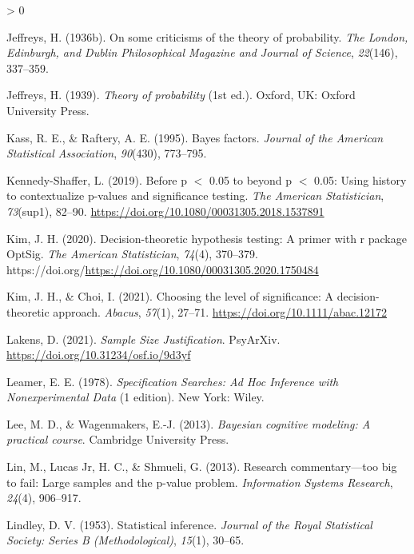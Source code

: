 \documentclass[
  english,
  ,man, a4paper,floatsintext]{apa6}
\newlength{\cslhangindent}
\newenvironment{CSLReferences}[2] %
 {%
  \setlength{\parindent}{0pt}
  \ifodd #1 \everypar{\setlength{\hangindent}{\cslhangindent}}\ignorespaces\fi
  \ifnum #2 > 0
  \setlength{\parskip}{#2\baselineskip}
  \fi
 }%
 {}
\begin{document}
\begin{CSLReferences}{1}{0}
\leavevmode\hypertarget{ref-jeffreys1936on}{}%
Jeffreys, H. (1936b). On some criticisms of the theory of probability. \emph{The London, Edinburgh, and Dublin Philosophical Magazine and Journal of Science}, \emph{22}(146), 337--359.

\leavevmode\hypertarget{ref-Jeffreys1939}{}%
Jeffreys, H. (1939). \emph{Theory of probability} (1st ed.). Oxford, UK: Oxford University Press.

\leavevmode\hypertarget{ref-kass1995bayes}{}%
Kass, R. E., \& Raftery, A. E. (1995). Bayes factors. \emph{Journal of the American Statistical Association}, \emph{90}(430), 773--795.

\leavevmode\hypertarget{ref-kennedy-shaffer_before_2019}{}%
Kennedy-Shaffer, L. (2019). Before p {\(<\)} 0.05 to beyond p {\(<\)} 0.05: Using history to contextualize p-values and significance testing. \emph{The American Statistician}, \emph{73}(sup1), 82--90. \url{https://doi.org/10.1080/00031305.2018.1537891}

\leavevmode\hypertarget{ref-kim2020decision}{}%
Kim, J. H. (2020). Decision-theoretic hypothesis testing: A primer with r package OptSig. \emph{The American Statistician}, \emph{74}(4), 370--379. https://doi.org/\url{https://doi.org/10.1080/00031305.2020.1750484}

\leavevmode\hypertarget{ref-kim2021choosing}{}%
Kim, J. H., \& Choi, I. (2021). Choosing the level of significance: A decision-theoretic approach. \emph{Abacus}, \emph{57}(1), 27--71. \url{https://doi.org/10.1111/abac.12172}

\leavevmode\hypertarget{ref-lakens_sample_2021}{}%
Lakens, D. (2021). \emph{Sample {Size} {Justification}}. PsyArXiv. \url{https://doi.org/10.31234/osf.io/9d3yf}

\leavevmode\hypertarget{ref-leamer_specification_1978}{}%
Leamer, E. E. (1978). \emph{Specification {Searches}: {Ad Hoc Inference} with {Nonexperimental Data}} (1 edition). {New York}: {Wiley}.

\leavevmode\hypertarget{ref-LeeWagenmakersBayesBook}{}%
Lee, M. D., \& Wagenmakers, E.-J. (2013). \emph{Bayesian cognitive modeling: {A} practical course}. Cambridge University Press.

\leavevmode\hypertarget{ref-lin2013research}{}%
Lin, M., Lucas Jr, H. C., \& Shmueli, G. (2013). Research commentary---too big to fail: Large samples and the p-value problem. \emph{Information Systems Research}, \emph{24}(4), 906--917.

\leavevmode\hypertarget{ref-lindley1953statistical}{}%
Lindley, D. V. (1953). Statistical inference. \emph{Journal of the Royal Statistical Society: Series B (Methodological)}, \emph{15}(1), 30--65.


\end{CSLReferences}
\end{document}

